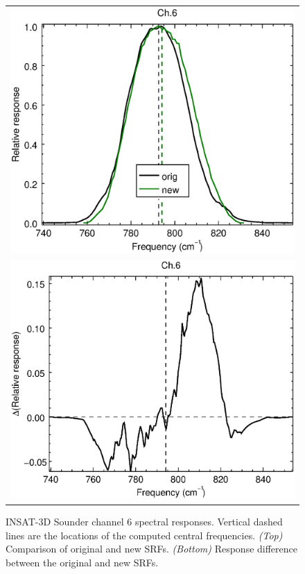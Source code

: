 \begin{figure}[H]
  \centering
  \begin{tabular}{c}
    \includegraphics[scale=0.55]{graphics/sndr/srf/sndr_insat3d-6.eps} \\
    \includegraphics[scale=0.55]{graphics/sndr/srf/sndr_insat3d-6.difference.eps}
  \end{tabular}
  \caption{INSAT-3D Sounder channel 6 spectral responses. Vertical dashed lines are the locations of the computed central frequencies. \emph{(Top)} Comparison of original and new SRFs. \emph{(Bottom)} Response difference between the original and new SRFs.}
  \label{fig:sndr_ch6}
\end{figure}


